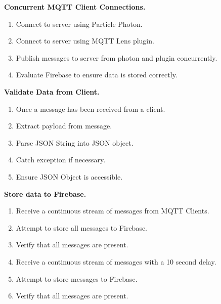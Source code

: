 \documentclass[a4paper,10pt]{article}
\begin{document}
		\textbf{Concurrent MQTT Client Connections.}
		\begin{enumerate}
			\item Connect to server using Particle Photon.
			\item Connect to server using MQTT Lens plugin.
			\item Publish messages to server from photon and plugin concurrently.
			\item Evaluate Firebase to ensure data is stored correctly.
		\end{enumerate}
		\textbf{Validate Data from Client.}
		\begin{enumerate}
			\item Once a message has been received from a client.
			\item Extract payload from message.
			\item Parse JSON String into JSON object.
			\item Catch exception if necessary.
			\item Ensure JSON Object is accessible.
		\end{enumerate}
		\textbf{Store data to Firebase.}
		\begin{enumerate}
			\item Receive a continuous stream of messages from MQTT Clients.
			\item Attempt to store all messages to Firebase.
			\item Verify that all messages are present.
			\item Receive a continuous stream of messages with a 10 second delay.
			\item Attempt to store messages to Firebase.
			\item Verify that all messages are present.
		\end{enumerate}
	
\end{document}
